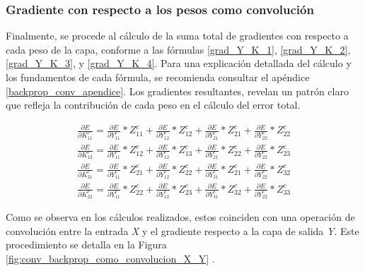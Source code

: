 \subsubsection{Gradiente con respecto a los pesos como convolución}

Finalmente, se procede al cálculo de la suma total de gradientes con respecto a cada peso de la capa, conforme a las fórmulas \ref{grad_Y_K_1}, \ref{grad_Y_K_2}, \ref{grad_Y_K_3}, y \ref{grad_Y_K_4}. Para una explicación detallada del cálculo y los fundamentos de cada fórmula, se recomienda consultar el apéndice \ref{backprop_conv_apendice}. Los gradientes resultantes, revelan un patrón claro que refleja la contribución de cada peso en el cálculo del error total.

\begin{gather}
	\frac{\partial E}{\partial K^c_{11}} = \frac{\partial E}{\partial Y^c_{11}} * Z^c_{11} + \frac{\partial E}{\partial Y^c_{12}} * Z^c_{12} + \frac{\partial E}{\partial Y^c_{21}} * Z^c_{21} + \frac{\partial E}{\partial Y^c_{22}} * Z^c_{22} \label{grad_Y_K_1} \\
	\frac{\partial E}{\partial K^c_{12}} = \frac{\partial E}{\partial Y^c_{11}} * Z^c_{12} + \frac{\partial E}{\partial Y^c_{12}} * Z^c_{13} + \frac{\partial E}{\partial Y^c_{21}} * Z^c_{22} + \frac{\partial E}{\partial Y^c_{22}} * Z^c_{23} \label{grad_Y_K_2} \\	
	\frac{\partial E}{\partial K^c_{21}} = \frac{\partial E}{\partial Y^c_{11}} * Z^c_{21} + \frac{\partial E}{\partial Y^c_{12}} * Z^c_{22} + \frac{\partial E}{\partial Y^c_{31}} * Z^c_{21} + \frac{\partial E}{\partial Y^c_{22}} * Z^c_{32} \label{grad_Y_K_3} \\
	\frac{\partial E}{\partial K^c_{22}} = \frac{\partial E}{\partial Y^c_{11}} * Z^c_{22} + \frac{\partial E}{\partial Y^c_{12}} * Z^c_{23} + \frac{\partial E}{\partial Y^c_{31}} * Z^c_{32} + \frac{\partial E}{\partial Y^c_{22}} * Z^c_{33} \label{grad_Y_K_4}
\end{gather}

Como se observa en los cálculos realizados, estos coinciden con una operación de convolución entre la entrada \textit{X} y el gradiente respecto a la capa de salida \textit{Y}. Este procedimiento se detalla en la Figura \ref{fig:conv_backprop_como_convolucion_X_Y} \cite{conv_backprop}.

